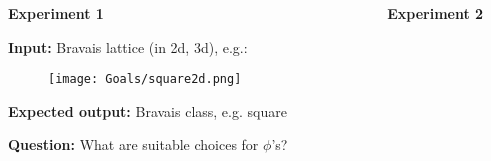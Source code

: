 \vspace{-0.5cm}
\begin{columns}[T]
    \begin{column}{0.49\textwidth}
        \textbf{Experiment 1}\par
        \textbf{Input:} Bravais lattice (in 2d, 3d), e.g.:
        \begin{figure}
            \centering
            \texttt{[image: Goals/square2d.png]}                        
        \end{figure}
        \textbf{Expected output:} Bravais class, e.g. square\par
        \textbf{Question:} What are suitable choices for $\phi$'s?
    \end{column}
    \begin{column}{0.01\textwidth}
    \end{column}
    \begin{column}{0.49\textwidth}
        \textbf{Experiment 2}\par 
    \end{column}
\end{columns}